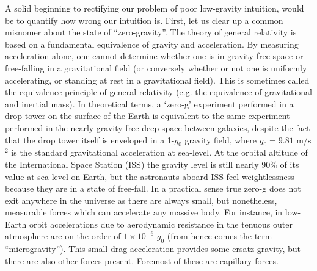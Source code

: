 \documentclass[12pt,a4paper,oneside]{book}
\begin{document}
A solid beginning to rectifying our problem of poor low-gravity intuition, would be to quantify how wrong our intuition is. First, let us clear up a common misnomer about the state of ``zero-gravity''. The theory of general relativity is based on a fundamental equivalence of gravity and acceleration. By measuring acceleration alone, one cannot determine whether one is in gravity-free space or free-falling in a gravitational field (or conversely whether or not one is uniformly accelerating, or standing at rest in a gravitational field). This is sometimes called the equivalence principle of general relativity (e.g. the equivalence of gravitational and inertial mass). In theoretical terms, a `zero-g' experiment performed in a drop tower on the surface of the Earth is equivalent to the same experiment performed in the nearly gravity-free deep space between galaxies, despite the fact that the drop tower itself is enveloped in a 1-$g_0$ gravity field, where $g_0=9.81$ m/s$^2$ is the standard gravitational acceleration at sea-level. At the orbital altitude of the International Space Station (ISS) the gravity level is still nearly 90\% of its value at sea-level on Earth, but the astronauts aboard ISS feel weightlessness because they are in a state of free-fall. In a practical sense true zero-g does not exit anywhere in the universe as there are always small, but nonetheless, measurable forces which can accelerate any massive body. For instance, in low-Earth orbit accelerations due to aerodynamic resistance in the tenuous outer atmosphere are on the order of $1 \times 10^{-6}$ $g_0$ (from hence comes the term ``microgravity''). This small drag acceleration provides some ersatz gravity, but there are also other forces present. Foremost of these are capillary forces. 
\end{document}
